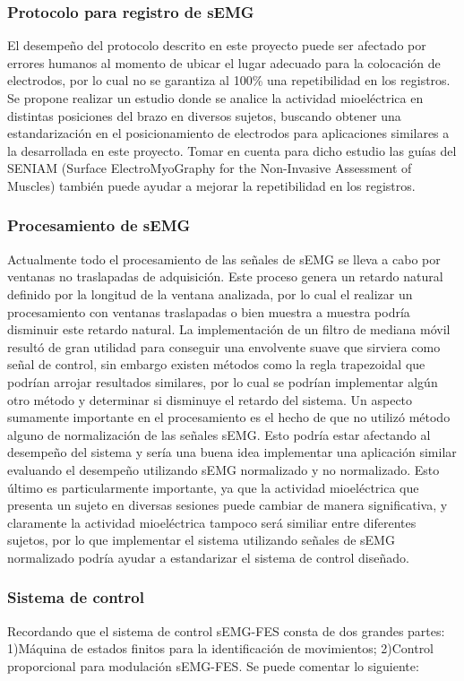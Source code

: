 \subsubsection*{Protocolo para registro de sEMG}
El desempeño del protocolo descrito en este proyecto puede ser afectado por errores humanos al momento de ubicar el lugar adecuado para la colocación de electrodos, por lo cual no se garantiza al 100\% una repetibilidad en los registros. Se propone realizar un estudio donde se analice la actividad mioeléctrica en distintas posiciones del brazo en diversos sujetos, buscando obtener una estandarización en el posicionamiento de electrodos para aplicaciones similares a la desarrollada en este proyecto. Tomar en cuenta para dicho estudio las guías del SENIAM (Surface ElectroMyoGraphy for the Non-Invasive Assessment of Muscles) también puede ayudar a mejorar la repetibilidad en los registros.

\subsubsection*{Procesamiento de sEMG}
Actualmente todo el procesamiento de las señales de sEMG se lleva a cabo por ventanas no traslapadas de adquisición. Este proceso genera un retardo natural definido por la longitud de la ventana analizada, por lo cual el realizar un procesamiento con ventanas traslapadas o bien muestra a muestra podría disminuir este retardo natural. La implementación de un filtro de mediana móvil resultó de gran utilidad para conseguir una envolvente suave que sirviera como señal de control, sin embargo existen métodos como la regla trapezoidal que podrían arrojar resultados similares, por lo cual se podrían implementar algún otro método y determinar si disminuye el retardo del sistema. Un aspecto sumamente importante en el procesamiento es el hecho de que no utilizó método alguno de normalización de las señales sEMG. Esto podría estar afectando al desempeño del sistema y sería una buena idea implementar una aplicación similar evaluando el desempeño utilizando sEMG normalizado y no normalizado. Esto último es particularmente importante, ya que la actividad mioeléctrica que presenta un sujeto en diversas sesiones puede cambiar de manera significativa, y claramente la actividad mioeléctrica tampoco será similiar entre diferentes sujetos, por lo que implementar el sistema utilizando señales de sEMG normalizado podría ayudar a estandarizar el sistema de control diseñado.

\subsubsection*{Sistema de control}
Recordando que el sistema de control sEMG-FES consta de dos grandes partes: 1)Máquina de estados finitos para la identificación de movimientos; 2)Control proporcional para modulación sEMG-FES. Se puede comentar lo siguiente:

